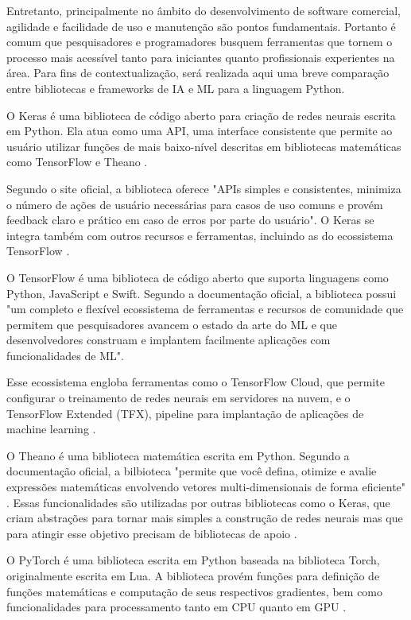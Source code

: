 Entretanto, principalmente no âmbito do desenvolvimento de software comercial, agilidade e facilidade de uso e manutenção são pontos fundamentais. Portanto é comum que pesquisadores e programadores busquem ferramentas que tornem o processo mais acessível tanto para iniciantes quanto profissionais experientes na área. Para fins de contextualização, será realizada aqui uma breve comparação entre bibliotecas e frameworks de IA e ML para a linguagem Python.

O Keras é uma biblioteca de código aberto para criação de redes neurais escrita em Python. Ela atua como uma API, uma interface consistente que permite ao usuário utilizar funções de mais baixo-nível descritas em bibliotecas matemáticas como TensorFlow e Theano \cite{brownlee19}. 

Segundo o site oficial, a biblioteca oferece "APIs simples e consistentes, minimiza o número de ações de usuário necessárias para casos de uso comuns e provém feedback claro e prático em caso de erros por parte do usuário". O Keras se integra também com outros recursos e ferramentas, incluindo as do ecossistema TensorFlow \cite{keras203}.

O TensorFlow é uma biblioteca de código aberto que suporta linguagens como Python, JavaScript e Swift. Segundo a documentação oficial, a biblioteca possui "um completo e flexível ecossistema de ferramentas e recursos de comunidade que permitem que pesquisadores avancem o estado da arte do ML e que desenvolvedores construam e implantem facilmente aplicações com funcionalidades de ML". 

Esse ecossistema engloba ferramentas como o TensorFlow Cloud, que permite configurar o treinamento de redes neurais em servidores na nuvem, e o TensorFlow Extended (TFX), pipeline para implantação de aplicações de machine learning \cite{tf20}.

O Theano é uma biblioteca matemática escrita em Python. Segundo a documentação oficial, a bilbioteca "permite que você defina, otimize e avalie expressões matemáticas envolvendo vetores multi-dimensionais de forma eficiente" \cite{theano20}. Essas funcionalidades são utilizadas por outras bibliotecas como o Keras, que criam abstrações para tornar mais simples a construção de redes neurais mas que para atingir esse objetivo precisam de bibliotecas de apoio \cite{theano16}.

O PyTorch é uma biblioteca escrita em Python baseada na biblioteca Torch, originalmente escrita em Lua. A biblioteca provém funções para definição de funções matemáticas e computação de seus respectivos gradientes, bem como funcionalidades para processamento tanto em CPU quanto em GPU \cite{ketkar17}. 

